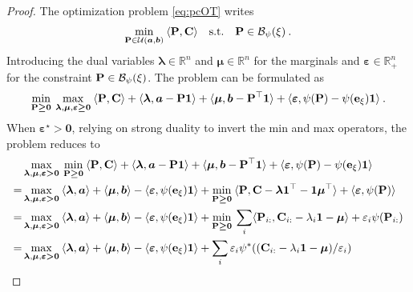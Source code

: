 \begin{proof}
The optimization problem \eqref{eq:pcOT} writes
\begin{align}
    \min_{{\mathbf{P}} \in {\mathcal{U}}(\bm{a}, \bm{b})} \: \langle {\mathbf{P}}, {\mathbf{C}} \rangle \quad \text{s.t.} \quad  {\mathbf{P}} \in \mathcal{B}_\psi(\xi) \:.
\end{align}
Introducing the dual variables $\bm{\lambda} \in \mathbb{R}^n$ and $\bm{\mu} \in \mathbb{R}^n$ for the marginals and $\bm{\varepsilon} \in \mathbb{R}_+^{n}$ for the constraint ${\mathbf{P}} \in \mathcal{B}_\psi(\xi)$. The problem can be formulated as
\begin{align}
    \min_{{\mathbf{P}} \bm{\geq} \bm{0}} \: \max_{\bm{\lambda}, \bm{\mu}, \bm{\varepsilon} \bm{\geq} \bm{0}} \: \langle {\mathbf{P}}, {\mathbf{C}} \rangle + \langle \bm{\lambda}, \bm{a} - {\mathbf{P}} \bm{1} \rangle + \langle \bm{\mu}, \bm{b} - {\mathbf{P}}^\top \bm{1} \rangle + \langle \bm{\varepsilon}, \psi({\mathbf{P}}) - \psi(\mathbf{e}_\xi) \bm{1} \rangle \:.
\end{align} 
When $\bm{\varepsilon}^\star \bm{>} \bm{0}$, relying on strong duality to invert the min and max operators, the problem reduces to
\begin{align}
    &\max_{\bm{\lambda}, \bm{\mu}, \bm{\varepsilon} \bm{>} \bm{0}} \: \min_{\mP \bm{\geq} \bm{0}} \: \langle \mP, \C \rangle + \langle \bm{\lambda}, \bm{a} - \mP \bm{1} \rangle + \langle \bm{\mu}, \bm{b} - \mP^\top \bm{1} \rangle + \langle \bm{\varepsilon}, \psi(\mP) - \psi(\mathbf{e}_\xi) \bm{1} \rangle \\
    = &\max_{\bm{\lambda}, \bm{\mu}, \bm{\varepsilon} \bm{>} \bm{0}} \: \langle \bm{\lambda}, \bm{a} \rangle + \langle \bm{\mu}, \bm{b} \rangle - \langle \bm{\varepsilon}, \psi(\mathbf{e}_\xi) \bm{1} \rangle + \min_{\mP \bm{\geq} \bm{0}} \: \langle \mP, \mC - \bm{\lambda}\bm{1}^\top - \bm{1}\bm{\mu}^\top \rangle + \langle \bm{\varepsilon}, \psi(\mP) \rangle \\
    = &\max_{\bm{\lambda}, \bm{\mu}, \bm{\varepsilon} \bm{>} \bm{0}} \: \langle \bm{\lambda}, \bm{a} \rangle + \langle \bm{\mu}, \bm{b} \rangle - \langle \bm{\varepsilon}, \psi(\mathbf{e}_\xi) \bm{1} \rangle + \min_{\mP \bm{\geq} \bm{0}} \: \sum_i \langle \mP_{i:}, \C_{i:} - \lambda_i \bm{1} - \bm{\mu} \rangle + \varepsilon_i \psi(\mP_{i:}) \\
    = &\max_{\bm{\lambda}, \bm{\mu}, \bm{\varepsilon} \bm{>} \bm{0}}  \: \langle \bm{\lambda}, \bm{a} \rangle + \langle \bm{\mu}, \bm{b} \rangle - \langle \bm{\varepsilon}, \psi(\mathbf{e}_\xi) \bm{1} \rangle + \sum_i \varepsilon_i \psi^*((\C_{i:} - \lambda_i \bm{1} - \bm{\mu}) / \varepsilon_i) \\

\end{align}
\end{proof}
